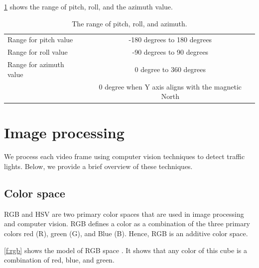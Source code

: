 \ref{t:rpy} shows the range of pitch, roll, and the azimuth value.
\begin{table}[h!]
  \centering
 
  \begin{tabular}{  l   c  }
    \rowcolor{gray!50}
    \hline
    Range for pitch value & -180 degrees to 180 degrees \\
    Range for roll value & -90 degrees to 90 degrees  \\
    Range for azimuth value & 0 degree to 360 degrees \\
    \rowcolor{gray!50}
    & 0 degree when Y axis aligns with the magnetic North \\
    
  \end{tabular}
  \caption{The range of pitch, roll, and azimuth.}
  \label{t:rpy}
\end{table}


\section {Image processing}
We process each video frame using computer vision techniques to detect traffic lights. 
Below, we provide a brief overview of these techniques. 

\subsection{Color space}
\label{s:color_space}
RGB \cite{rgb} and HSV \cite{hsv} are two primary color spaces that are used in image processing and computer vision.
RGB defines a color as a combination of the three primary colors red (R), green (G), and Blue (B).
Hence, RGB is an additive color space.

\ref{f:rgb} shows the model of RGB space \cite{rgb}.
It shows that any color of this cube is a combination of red, blue, and green.

